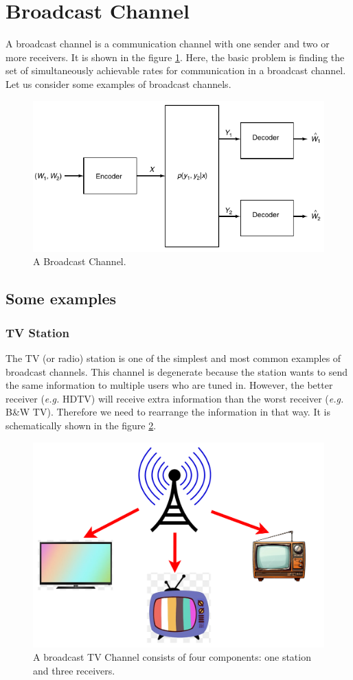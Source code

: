 \section{Broadcast Channel}
A broadcast channel is a communication channel with one sender and two or more receivers. It is shown in the figure \ref{fig:BC}. Here, the basic problem is finding the set of simultaneously achievable rates for communication in a broadcast channel. Let us consider some examples of broadcast channels.
%
\begin{figure}[h]
    \centering
    \includegraphics[scale=0.5]{Diagrams/BC.png}
    \caption{A Broadcast Channel.}
    \label{fig:BC}
\end{figure}
%

\subsection{Some examples}
\subsubsection*{TV Station}
The TV (or radio) station is one of the simplest and most common examples of broadcast channels. This channel is degenerate because the station wants to send the same information to multiple users who are tuned in. However, the better receiver (\textit{e.g.} HDTV) will receive extra information than the worst receiver (\textit{e.g.} B\&W TV). Therefore we need to rearrange the information in that way. It is schematically shown in the figure \ref{fig:TVBC}.
%
\begin{figure}[h]
    \centering
    \includegraphics[width=0.4\linewidth]{Presentation Diagrams/TVBC.png}
    \caption{A broadcast TV Channel consists of four components: one station and three receivers.}
    \label{fig:TVBC}
\end{figure}
%

